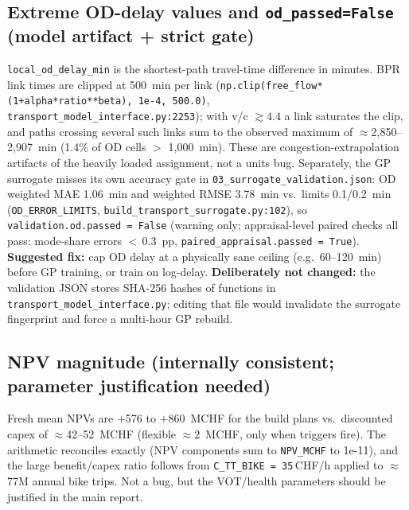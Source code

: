 \documentclass[11pt,a4paper]{article}
\begin{document}
\subsection{Extreme OD-delay values and \texttt{od\_passed=False} (model artifact + strict gate)}
\texttt{local\_od\_delay\_min} is the shortest-path travel-time difference in
minutes. BPR link times are clipped at 500~min per link
(\texttt{np.clip(free\_flow*(1+alpha*ratio**beta), 1e-4, 500.0)},
\texttt{transport\_model\_interface.py:2253}); with v/c $\gtrsim 4.4$ a link saturates the
clip, and paths crossing several such links sum to the observed maximum of
$\approx$2{,}850--2{,}907~min (1.4\% of OD cells $>$ 1{,}000~min). These are
congestion-extrapolation artifacts of the heavily loaded assignment, not a units bug.
Separately, the GP surrogate misses its own accuracy gate in
\texttt{03\_surrogate\_validation.json}: OD weighted MAE 1.06~min and weighted RMSE
3.78~min vs.\ limits 0.1/0.2~min (\texttt{OD\_ERROR\_LIMITS},
\texttt{build\_transport\_surrogate.py:102}), so \texttt{validation.od.passed = False}
(warning only; appraisal-level paired checks all pass: mode-share errors ${<}\,0.3$~pp,
\texttt{paired\_appraisal.passed = True}). \textbf{Suggested fix:} cap OD delay at a
physically sane ceiling (e.g.\ 60--120~min) before GP training, or train on log-delay.
\textbf{Deliberately not changed:} the validation JSON stores SHA-256 hashes of functions
in \texttt{transport\_model\_interface.py}; editing that file would invalidate the
surrogate fingerprint and force a multi-hour GP rebuild.

\subsection{NPV magnitude (internally consistent; parameter justification needed)}
Fresh mean NPVs are $+$576 to $+$860~MCHF for the build plans vs.\ discounted capex
of $\approx$42--52~MCHF (flexible $\approx$2~MCHF, only when triggers fire).
The arithmetic reconciles exactly (NPV components sum to \texttt{NPV\_MCHF} to
1e-11), and the large benefit/capex ratio follows from
\texttt{C\_TT\_BIKE = 35}\,CHF/h applied to $\approx$77M annual bike trips.
Not a bug, but the VOT/health parameters should be justified in the main report.
\end{document}
